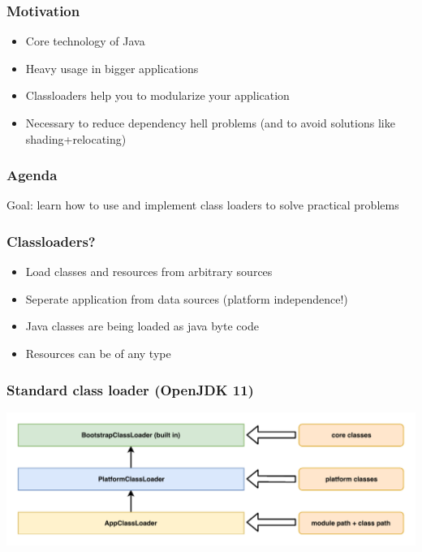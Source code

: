 \documentclass[aspectratio=169]{beamer}
\begin{document}
\begin{frame}
	\frametitle{Motivation}
	\begin{itemize}
		\item{Core technology of Java}
		\item{Heavy usage in bigger applications}
		\item{Classloaders help you to modularize your application}
		\item{Necessary to reduce dependency hell problems (and to avoid solutions like shading+relocating)}
	\end{itemize}
\end{frame}

\begin{frame}
	\frametitle{Agenda}
	Goal: learn how to use and implement class loaders to solve practical problems
	\tableofcontents
\end{frame}

\begin{frame}
	\frametitle{Classloaders?}
	\begin{itemize}
		\item{Load classes and resources from arbitrary sources}
		\item{Seperate application from data sources (platform independence!)}
		\item{Java classes are being loaded as java byte code}
		\item{Resources can be of any type}
	\end{itemize}
\end{frame}

\begin{frame}
	\frametitle{Standard class loader (OpenJDK 11)}
	\begin{center}
	    \includegraphics[scale=0.7]{assets/AllGraphicsTalk-classloader.pdf}
	\end{center}
\end{frame}
\end{document}
